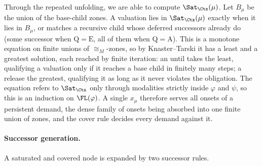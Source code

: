 Through the repeated unfolding, we are able to compute $\Sat_{\Ctx}(\mu)$. Let $B_\mu$ be the union of the base-child zones. A valuation lies in $\Sat_{\Ctx}(\mu)$
exactly when it lies in $B_\mu$, or matches a recursive child whose deferred successors
already do (some successor when $\mathrm{Q}=\mathrm{E}$, all of them when
$\mathrm{Q}=\mathrm{A}$). This is a monotone equation on finite unions of $\cong_M$-zones, so by Knaster--Tarski it has a
least and a greatest solution, each reached by finite iteration: an until takes the
least, qualifying a valuation only if it reaches a base child in finitely many steps; a
release the greatest, qualifying it as long as it never violates the obligation. The equation
refers to $\Sat_{\Ctx}$ only through modalities strictly inside $\varphi$ and $\psi$, so this
is an induction on $\FL(\varphi)$. A single $x_\mu$ therefore serves all onsets of a persistent
demand, the dense family of onsets being absorbed into one finite union of zones, and the
cover rule decides every demand against it.
%


\paragraph{Successor generation.}
A saturated and covered node is expanded by two successor rules.%


